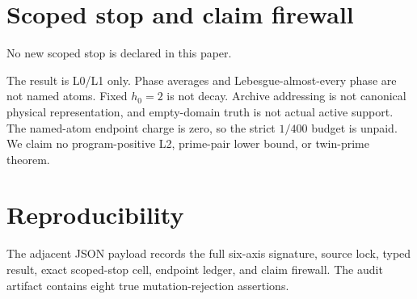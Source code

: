 \documentclass[11pt]{article}
\begin{document}
\section{Scoped stop and claim firewall}
No new scoped stop is declared in this paper.

The result is L0/L1 only.  Phase averages and Lebesgue-almost-every phase are
not named atoms.  Fixed $h_0=2$ is not decay.  Archive addressing is not
canonical physical representation, and empty-domain truth is not actual
active support.  The named-atom endpoint charge is zero, so the strict
$1/400$ budget is unpaid.  We claim no program-positive L2, prime-pair lower
bound, or twin-prime theorem.

\section{Reproducibility}
The adjacent JSON payload records the full six-axis signature, source lock,
typed result, exact scoped-stop cell, endpoint ledger, and claim firewall.
The audit artifact contains eight true mutation-rejection assertions.


\end{document}
